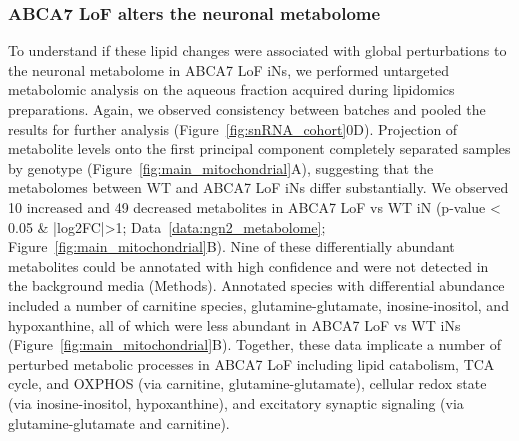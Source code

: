 \subsubsection{ABCA7 LoF alters the neuronal metabolome}
To understand if these lipid changes were associated with global perturbations to the neuronal metabolome in ABCA7 LoF iNs, we performed untargeted metabolomic analysis on the aqueous fraction acquired during lipidomics preparations. Again, we observed consistency between batches and pooled the results for further analysis (Figure~\ref{fig:snRNA_cohort}0D). Projection of metabolite levels onto the first principal component completely separated samples by genotype (Figure~\ref{fig:main_mitochondrial}A), suggesting that the metabolomes between WT and ABCA7 LoF iNs differ substantially. 
We observed 10 increased and 49 decreased metabolites in ABCA7 LoF vs WT iN (p-value < 0.05 & |log2FC|>1; Data~\ref{data:ngn2_metabolome}; Figure~\ref{fig:main_mitochondrial}B). Nine of these differentially abundant metabolites could be annotated with high confidence and were not detected in the background media (Methods). Annotated species with differential abundance included a number of carnitine species, glutamine-glutamate, inosine-inositol, and hypoxanthine, all of which were less abundant in ABCA7 LoF vs WT iNs (Figure~\ref{fig:main_mitochondrial}B). Together, these data implicate a number of perturbed metabolic processes in ABCA7 LoF including lipid catabolism, TCA cycle, and OXPHOS (via carnitine\cite{Virmani2022-uc}, glutamine-glutamate\cite{Yoo2020-lh,noauthor_2023-sp}), cellular redox state (via inosine-inositol\cite{Chatree2020-qn,Basile2022-dd}, hypoxanthine\cite{Furuhashi2020-oi,Lee2018-tk}), and excitatory synaptic signaling (via glutamine-glutamate\cite{Morland2022-dk,noauthor_2021-cn,noauthor_2022-jz} and carnitine\cite{Inazu2008-wg,noauthor_2016-gp,Janiri1991-sx}). 

